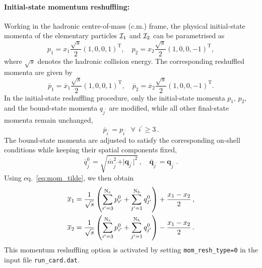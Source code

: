\paragraph{Initial-state momentum reshuffling:}
Working in the hadronic centre-of-mass (c.m.) frame, the physical initial-state momenta of the elementary particles ${\cal I}_1$ and ${\cal I}_2$ can be parametrised as
\begin{equation}
    p_1 = x_1\dfrac{\sqrt{s}}{2}(1,0,0,1)^\mathrm{T},\quad p_2 = x_2\dfrac{\sqrt{s}}{2}(1,0,0,-1)^\mathrm{T},
\end{equation}
where $\sqrt{s}$ denotes the hadronic collision energy. The corresponding reshuffled momenta are given by
\begin{equation}
    \overline{p}_1 = \overline{x}_1\dfrac{\sqrt{s}}{2}(1,0,0,1)^\mathrm{T},\quad \overline{p}_2 = \overline{x}_2\dfrac{\sqrt{s}}{2}(1,0,0,-1)^\mathrm{T}.
\end{equation}
In the initial-state reshuffling procedure, only the initial-state momenta $p_1$, $p_2$, and the bound-state momenta $q_{j^\prime}$ are modified, while all other final-state momenta remain unchanged,
\begin{equation}
    \overline{p}_{i^\prime} = p_{i^\prime}\,\ \ \forall\ \ i^\prime \ge 3\,.
\end{equation}
The bound-state momenta are adjusted to satisfy the corresponding on-shell conditions while keeping their spatial components fixed,
\begin{equation}
    \overline{q}_{j^\prime}^{0} = \sqrt{\overline{m}_{j^\prime}^2+\vert \bm{q}_{j^\prime} \vert^2}\,,\quad \overline{\bm{q}}_{j^\prime}^{\phantom{0}} = \bm{q}_{j^\prime}^{\phantom{0}}\,.
\end{equation}
Using eq.~\eqref{eq:mom_tilde}, we then obtain
\begin{align}
    \overline{x}_1 & = \dfrac{1}{\sqrt{s}}\left(\sum_{i^\prime=3}^{{\rm N}_e}p_{i^\prime}^0+\sum_{j^\prime=1}^{{\rm N}_b}q_{j^\prime}^0\right)+\dfrac{x_1-x_2}{2}\,,\\
    \overline{x}_2 & = \dfrac{1}{\sqrt{s}}\left(\sum_{i^\prime=3}^{{\rm N}_e}p_{i^\prime}^0+\sum_{j^\prime=1}^{{\rm N}_b}q_{j^\prime}^0\right)-\dfrac{x_1-x_2}{2}\,.
\end{align}
This momentum reshuffling option is activated by setting \texttt{mom\_resh\_type=0} in the input file \texttt{run\_card.dat}.


